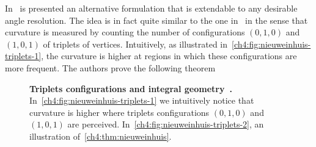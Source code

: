 In~\cite{nieuwenhuis14efficient} is presented an alternative formulation that is extendable to any desirable angle resolution. The idea is in fact quite similar to the one in~\cite{zehiry10fast} in the sense that curvature is measured by counting the number of configurations $(0,1,0)$ and $(1,0,1)$ of triplets of vertices. Intuitively, as illustrated in~\cref{ch4:fig:nieuweinhuis-triplets-1}, the curvature is higher at regions in which these configurations are more frequent. The authors prove the following theorem

\begin{figure}
\center
{}
\caption{\textbf{Triplets configurations and integral geometry~\cite{nieuwenhuis14efficient}.} In~\cref{ch4:fig:nieuweinhuis-triplets-1} we intuitively notice that curvature is higher where triplets configurations $(0,1,0)$ and $(1,0,1)$ are perceived. In~\cref{ch4:fig:nieuweinhuis-triplets-2}, an illustration of~\cref{ch4:thm:nieuweinhuis}. }
\label{ch4:fig:nieuweinhuis-triplets}
\end{figure}

